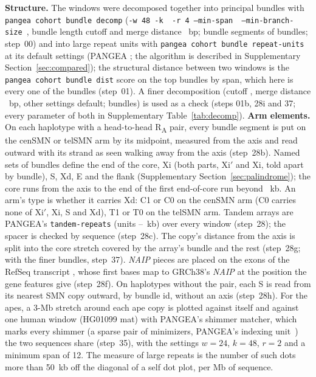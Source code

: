 \documentclass[10pt]{article}
\newcommand{\RU}[1]{R\textsubscript{#1}}%
\begin{document}
\textbf{Structure.} The windows were decomposed together into principal bundles with \texttt{pangea cohort bundle decomp}
(\texttt{-w~48 -k~\dpCK{} -r~4 --min-span~\dpCSpan{} --min-branch-size~\dpCBranch{}}, bundle length cutoff and merge
distance \dpCCut~bp; \dpCSegs{} bundle segments of \dpCBids{} bundles; step~00) and into large repeat units with \texttt{pangea cohort bundle
repeat-units} at its default settings (PANGEA \verPangea; the algorithm is described in Supplementary Section~\ref{sec:compared}); the structural distance between two windows is the
\texttt{pangea cohort bundle dist} score on the top \setTopN{} bundles by span, which here is every one of the \dpCBids{} bundles (step~01). A finer decomposition (cutoff \dpFCut, merge distance \dpFMerge~bp, other settings default; \dpFBids{} bundles) is
used as a check (steps 01b, 28i and 37; every parameter of both in Supplementary Table~\ref{tab:decomp}).
\textbf{Arm elements.} On each haplotype with a head-to-head \RU{A} pair, every bundle segment is put on the cenSMN or
telSMN arm by its midpoint, measured from the axis and read outward with its strand as seen walking away from the axis
(step~28b). Named sets of bundles define the end of the core, Xi (both parts, Xi$'$ and Xi, told apart by bundle), S, Xd, E and the flank (Supplementary
Section~\ref{sec:palindrome}); the core runs from the axis to the end of the first end-of-core run beyond \elAstart~kb. An arm's
type is whether it carries Xd: C1 or C0 on the cenSMN arm (C0 carries none of Xi$'$, Xi, S and Xd), T1 or T0 on the telSMN
arm. Tandem arrays are PANGEA's \texttt{tandem-repeats} (units \trMinKb--\trMaxKb~kb) over every window (step~28); the spacer is
checked by sequence (step~28c). The copy's distance from the axis is split into the core stretch covered by the array's bundle and the rest
(step~28g; with the finer bundles, step~37). \emph{NAIP} pieces are placed on the exons of the RefSeq
transcript \nxTx, whose first bases map to GRCh38's \emph{NAIP} at the position the gene features give (step~28f). On haplotypes without the
pair, each S is read from its nearest SMN copy outward, by bundle id, without an axis (step~28h). For the apes, a 3-Mb
stretch around each ape copy is plotted against itself and against one human window (HG01099 mat) with PANGEA's shimmer
matcher, which marks every shimmer (a sparse pair of minimizers, PANGEA's indexing unit~\cite{chin2023}) the two sequences share (step~35), with the settings $w=24$, $k=48$, $r=2$ and a minimum span of 12. The measure of large repeats is the number of such dots more than 50~kb off the diagonal of a self dot plot, per Mb of sequence.
\end{document}
